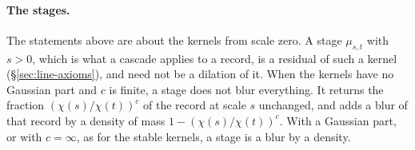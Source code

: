 \paragraph{The stages.} The statements above are about the kernels from scale zero. A stage
$\mu_{s,t}$ with $s > 0$, which is what a cascade applies to a record, is a residual of such a
kernel (\S\ref{sec:line-axioms}), and need not be a dilation of it. When the kernels have no Gaussian
part and $c$ is finite, a stage does not blur everything. It returns the fraction
$(\chi(s)/\chi(t))^c$ of the record at scale $s$ unchanged, and adds a blur of that record by a
density of mass $1 - (\chi(s)/\chi(t))^c$. With a Gaussian part, or with $c = \infty$, as for
the stable kernels, a stage is a blur by a density.

